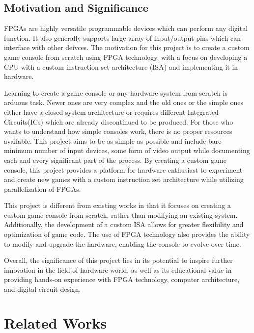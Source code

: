 \documentclass[a4paper,12pt]{article}
\begin{document}
    \subsection{Motivation and Significance}
    FPGAs are highly versatile programmable devices which can perform any digital function. It also generally supports large array of input/output pins which can interface with other deivces. The motivation for this project is to create a custom game console from scratch using FPGA technology, with a focus on developing a CPU with a custom instruction set architecture (ISA) and implementing it in hardware. 

    Learning to create a game console or any hardware system from scratch is arduous task. Newer ones are very complex and the old ones or the simple ones either have a closed system architecture or requires different Integrated Circuits(ICs) which are already discontinued to be produced. For those who wants to understand how simple consoles work, there is no proper resources available. This project aims to be as simple as possible and include bare minimum number of input devices, some form of video output while documenting each and every significant part of the process. By creating a custom game console, this project provides a platform for hardware enthusiast to experiment and create new games with a custom instruction set architecture while utilizing parallelization of FPGAs.

    This project is different from existing works in that it focuses on creating a custom game console from scratch, rather than modifying an existing system. Additionally, the development of a custom ISA allows for greater flexibility and optimization of game code. The use of FPGA technology also provides the ability to modify and upgrade the hardware, enabling the console to evolve over time.

    Overall, the significance of this project lies in its potential to inspire further innovation in the field of hardware world, as well as its educational value in providing hands-on experience with FPGA technology, computer architecture, and digital circuit design.
    \newpage
    \section{Related Works}
\end{document}
